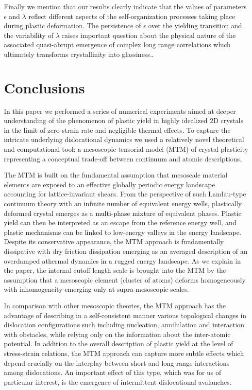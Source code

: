 \documentclass[aps,
superscriptaddress,notitlepage]{revtex4-1}
\begin{document}
Finally we mention that our results clearly indicate that the values of parameters $\epsilon$ and $\lambda$ reflect   different aspects of the self-organization processes taking place during plastic deformation.  The persistence of $\epsilon$ over the yielding transition and the variability of $\lambda$  raises important question about  the  physical nature of  the associated  quasi-abrupt emergence of complex long range correlations which ultimately  transforms  crystallinity into glassiness.\cite{Regev2017-ks,Charbonneau2014-gv,Fu2025-tl}.
\section{Conclusions}

In this paper we performed a series of numerical experiments aimed at deeper understanding of  the phenomenon of plastic yield  in highly idealized   2D crystals in the limit of zero strain rate and negligible thermal effects. To capture the intricate underlying dislocational dynamics  we used a relatively novel theoretical  and computational tool:  a mesoscopic tensorial model  (MTM) of crystal plasticity representing a conceptual trade-off between continuum  and atomic descriptions. 


The MTM is built on the fundamental assumption that mesoscale material elements are exposed to an effective globally periodic  energy landscape  accounting for lattice-invariant shears. From the perspective of such Landau-type continuum theory with an infinite number of equivalent energy wells, plastically deformed crystal emerges as a multi-phase mixture of equivalent phases. Plastic yield can then be interpreted as an escape from the reference energy well, and plastic mechanisms can be linked to low-energy valleys in the energy landscape.  Despite its conservative appearance, the MTM approach is fundamentally dissipative with  dry friction  dissipation emerging as an averaged  description of an overdamped athermal dynamics in a rugged energy landscape.  As we explain in the paper, the internal cutoff length scale is brought into the MTM by the assumption that a mesoscopic element (cluster of atoms) deforms homogeneously with inhomogeneity emerging only at supra-mesoscopic scales. 

In comparison with other mesoscopic theories, the MTM  approach has the advantage of describing in a self-consistent manner various topological changes in dislocation configurations such including  nucleation, annihilation and  interaction with obstacles, while relying only on the information about  the inter-atomic potential.  In addition to the overall description of plastic yield at the level of stress-strain relations, the MTM approach can  capture more  subtle  effects  which depend crucially on the interplay between short and long range interactions among  dislocations. An important effect of this type, which was for us of particular interest,  is the emergence of  intermittent  dislocational avalanches. 
\end{document}
